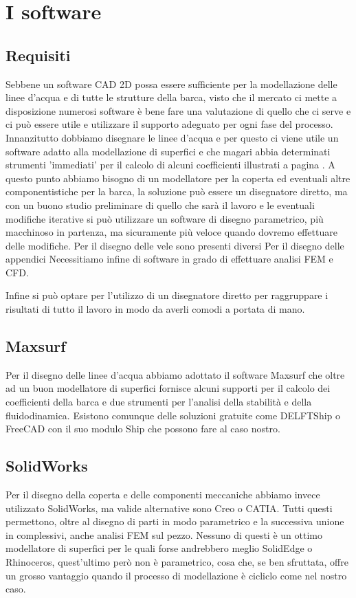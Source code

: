 \chapter{I software}
	\section{Requisiti}
		Sebbene un software CAD 2D possa essere sufficiente per la modellazione delle linee d'acqua e di tutte le strutture della barca, visto che il mercato ci mette a disposizione numerosi software è bene fare una valutazione di quello che ci serve e ci può essere utile e utilizzare il supporto adeguato per ogni fase del processo.
		Innanzitutto dobbiamo disegnare le linee d'acqua e per questo ci viene utile un software adatto alla modellazione di superfici e che magari abbia determinati strumenti 'immediati' per il calcolo di alcuni coefficienti illustrati a pagina  \pageref{chap:coefficienti}.
		A questo punto abbiamo bisogno di un modellatore per la coperta ed eventuali altre componentistiche per la barca, la soluzione può essere un disegnatore diretto, ma con un buono studio preliminare di quello che sarà il lavoro e le eventuali modifiche iterative si può utilizzare un software di disegno parametrico, più macchinoso in partenza, ma sicuramente più veloce quando dovremo effettuare delle modifiche.
		Per il disegno delle vele sono presenti diversi
		Per il disegno delle appendici
		Necessitiamo infine di software in grado di effettuare analisi FEM e CFD.
	
		Infine si può optare per l'utilizzo di un disegnatore diretto per raggruppare i risultati di tutto il lavoro in modo da averli comodi a portata di mano.
	
	\section{Maxsurf}
		Per il disegno delle linee d'acqua abbiamo adottato il software Maxsurf che oltre ad un buon modellatore di superfici fornisce alcuni supporti per il calcolo dei coefficienti della barca e due strumenti per l'analisi della stabilità e della fluidodinamica.
		Esistono comunque delle soluzioni gratuite come DELFTShip o FreeCAD con il suo modulo Ship che possono fare al caso nostro.
	
	\section{SolidWorks}
		Per il disegno della coperta e delle componenti meccaniche abbiamo invece utilizzato SolidWorks, ma valide alternative sono Creo o CATIA. Tutti questi permettono, oltre al disegno di parti in modo parametrico e la successiva unione in complessivi, anche analisi FEM sul pezzo. Nessuno di questi è un ottimo modellatore di superfici per le quali forse andrebbero meglio SolidEdge o Rhinoceros, quest'ultimo però non è parametrico, cosa che, se ben sfruttata, offre un grosso vantaggio quando il processo di modellazione è cicliclo come nel nostro caso.
	
